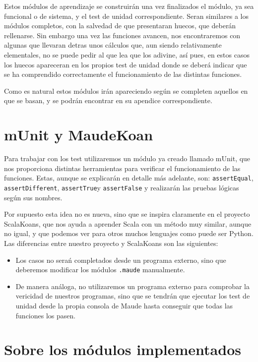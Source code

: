Estos módulos de aprendizaje se construirán una vez finalizados el módulo, ya sea funcional o de sistema, y el test de unidad correspondiente. Seran similares a los módulos completos, con la salvedad de que presentaran huecos, que deberán rellenarse. Sin embargo una vez las funciones avancen, nos encontraremos con algunas que llevaran detras unos cálculos que, aun siendo relativamente elementales, no se puede pedir al que lea que los adivine, así pues, en estos casos los huecos apareceran en los propios test de unidad donde se deberá indicar que se ha comprendido correctamente el funcionamiento de las distintas funciones. \par

Como es natural estos módulos irán apareciendo según se completen aquellos en que se basan, y se podrán encontrar en su apendice correspondiente.\par 


\section{mUnit y MaudeKoan}

Para trabajar con los test utilizaremos un módulo ya creado llamado mUnit, que nos proporciona distintas herramientas para verificar el funcionamiento de las funciones. Estas, aunque se explicarán en detalle más adelante, son: \verb"assertEqual", \verb"assertDifferent", \verb"assertTrue"y \verb"assertFalse" y realizarán las pruebas lógicas según sus nombres.\par

Por supuesto esta idea no es nueva, sino que se inspira claramente en el proyecto ScalaKoans, que nos ayuda a aprender Scala con un método muy similar, aunque no igual, y que podemos ver para otros muchos lenguajes como puede ser Python. Las diferencias entre nuestro proyecto y ScalaKoans son las siguientes:\par
\begin{itemize}
\item Los casos no serań completados desde un programa externo, sino que deberemos modificar los módulos \texttt{.maude} manualmente.
\item De manera análoga, no utilizaremos un programa externo para comprobar la vericidad de nuestros programas, sino que se tendrán que ejecutar los test de unidad desde la propia consola de Maude hasta conseguir que todas las funciones los pasen.
\end{itemize}

\section{Sobre los módulos implementados}

